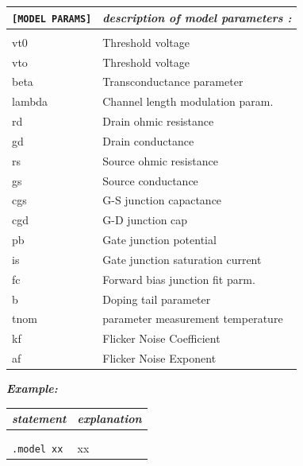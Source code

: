 \begin{longtable}{l l}		
\texttt{[MODEL PARAMS]} & \textit{description of model parameters :} \\ \hline \\ \vspace{-0.8\parskip}
																					{\small vt0 } & {\small  Threshold voltage} \\
																					{\small vto } & {\small  Threshold voltage} \\
																					{\small beta } & {\small  Transconductance parameter} \\
																					{\small lambda } & {\small  Channel length modulation param.} \\
																					{\small rd } & {\small  Drain ohmic resistance} \\
																					{\small gd } & {\small  Drain conductance} \\
																					{\small rs } & {\small  Source ohmic resistance} \\
																					{\small gs } & {\small  Source conductance} \\
																					{\small cgs } & {\small  G-S junction capactance} \\
																					{\small cgd } & {\small  G-D junction cap} \\
																					{\small pb } & {\small  Gate junction potential} \\
																					{\small is } & {\small  Gate junction saturation current} \\
																					{\small fc } & {\small  Forward bias junction fit parm.} \\

																					{\small b } & {\small  Doping tail parameter} \\

																					{\small tnom } & {\small  parameter measurement temperature} \\
																					{\small kf } & {\small  Flicker Noise Coefficient} \\
																					{\small af } & {\small  Flicker Noise Exponent} 
\end{longtable}																				


\textbf{\textit{Example:}}

\begin{longtable}{l l}
\textit{statement} & \textit{explanation} \\ \hline \\ %
			\begin{minipage}{15em}{\texttt{xx}\\ 
			\texttt{.model xx}}\end{minipage}
			& \begin{minipage}{15em}{{\small xx}}\end{minipage} 
\end{longtable}


